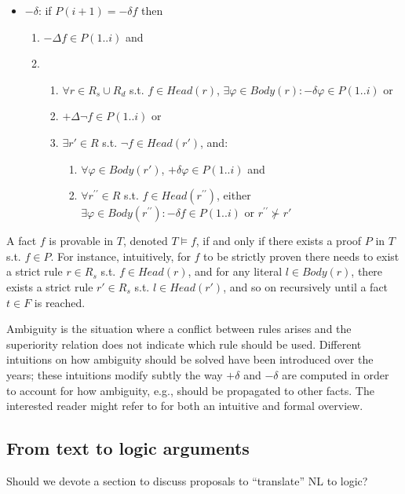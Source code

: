 \documentclass[version=3.21, pagesize, twoside=off, bibliography=totoc, DIV=calc, fontsize=12pt, a4paper, french, english]{scrartcl}
\begin{document}
\begin{itemize}
\item $-\delta$: if $P(i+1) = -\delta f$ then
  \begin{enumerate}
  \item $-\Delta f \in P(1..i)$ and
  \item \vspace{-0.1cm}
    \begin{enumerate}
    \item $\forall r \in R_s \cup R_d$ s.t. $f \in Head(r)$, $\exists \varphi \in Body(r): -\delta \varphi \in P(1..i)$ or
    \item $+\Delta \lnot f \in P(1..i)$ or
    \item $\exists r' \in R$ s.t. $\lnot f \in Head(r')$, and:
      \begin{enumerate}
      \item $\forall \varphi \in Body(r')$, $+\delta \varphi \in P(1..i)$ and
      \item $\forall r^{\prime\prime} \in R$ s.t. $f \in Head(r^{\prime\prime})$, either $\exists \varphi \in Body(r^{\prime\prime}): -\delta f \in P(1..i)$ or $r^{\prime\prime} \not\succ r'$
      \end{enumerate}
    \end{enumerate}
  \end{enumerate}
\end{itemize}

A fact $f$ is provable in $T$, denoted $T \models f$, if and only if there exists a proof $P$ in $T$ s.t. $f \in P$. For instance, intuitively, for $f$ to be strictly proven there needs to exist a strict rule $r \in R_s$ s.t. $f \in Head(r)$, and for any literal $l \in Body(r)$, there exists a strict rule $r' \in R_s$ s.t. $l \in Head(r')$, and so on recursively until a fact $t \in F$ is reached.

Ambiguity is the situation where a conflict between rules arises and the superiority relation does not indicate which rule should be used. Different intuitions on how ambiguity should be solved have been introduced over the years; these intuitions modify subtly the way $+\delta$ and $-\delta$ are computed in order to account for how ambiguity, e.g., should be propagated to other facts. The interested reader might refer to \cite{Hecham2018} for both an intuitive and formal overview.


\subsection{From text to logic arguments}
Should we devote a section to discuss proposals to “translate” NL to logic?
\end{document}
